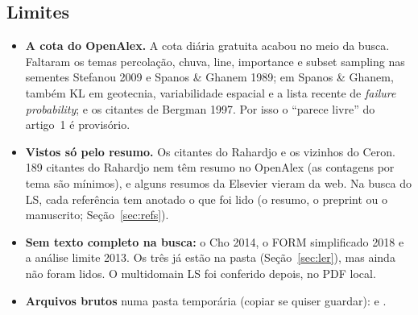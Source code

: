 \documentclass[11pt,a4paper]{article}
\begin{document}
\subsection{Limites}
\begin{itemize}
  \item \textbf{A cota do OpenAlex.} A cota diária gratuita acabou no meio da busca. Faltaram os temas percolação,
    chuva, line, importance e subset sampling nas sementes Stefanou 2009 e Spanos \& Ghanem 1989; em Spanos \& Ghanem,
    também KL em geotecnia, variabilidade espacial e a lista recente de \emph{failure probability}; e os citantes de
    Bergman 1997. Por isso o ``parece livre'' do artigo~1 é provisório.
  \item \textbf{Vistos só pelo resumo.} Os citantes do Rahardjo e os vizinhos do Ceron. 189 citantes do Rahardjo nem
    têm resumo no OpenAlex (as contagens por tema são mínimos), e alguns resumos da Elsevier vieram da web. Na busca do
    LS, cada referência tem anotado o que foi lido (o resumo, o preprint ou o manuscrito; Seção~\ref{sec:refs}).
  \item \textbf{Sem texto completo na busca:} o Cho 2014, o FORM simplificado 2018 e a análise limite 2013. Os três já
    estão na pasta (Seção~\ref{sec:ler}), mas ainda não foram lidos. O multidomain LS foi conferido depois, no PDF local.
  \item {\raggedright \textbf{Arquivos brutos} numa pasta temporária (copiar se quiser guardar):
     e
    .\par}
\end{itemize}
\end{document}
